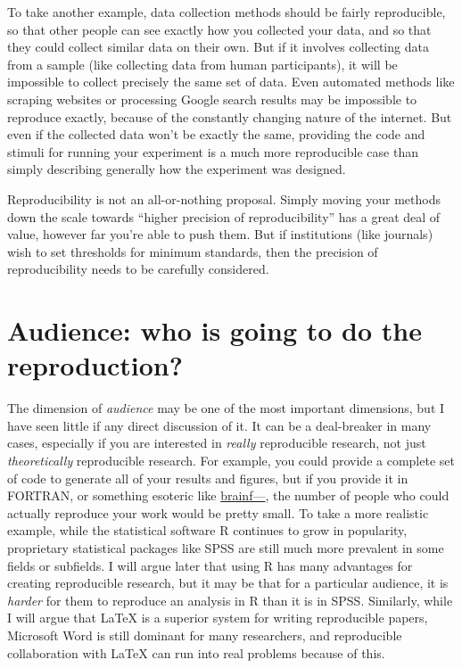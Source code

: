 \documentclass{book}
\begin{document}
To take another example, data collection methods should be fairly reproducible, so that other people can see exactly how you collected your data, and so that they could collect similar data on their own. But if it involves collecting data from a sample (like collecting data from human participants), it will be impossible to collect precisely the same set of data.  Even automated methods like scraping websites or processing Google search results may be impossible to reproduce exactly, because of the constantly changing nature of the internet.  But even if the collected data won't be exactly the same, providing the code and stimuli for running your experiment is a much more reproducible case than simply describing generally how the experiment was designed.

Reproducibility is not an all-or-nothing proposal. Simply moving your methods down the scale towards ``higher precision of reproducibility'' has a great deal of value, however far you're able to push them.  But if institutions (like journals) wish to set thresholds for minimum standards, then the precision of reproducibility needs to be carefully considered.
\section{Audience: who is going to do the reproduction?}
\label{sec-3-3}

The dimension of \emph{audience} may be one of the most important dimensions, but I have seen little if any direct discussion of it. It can be a deal-breaker in many cases, especially if you are interested in \emph{really} reproducible research, not just \emph{theoretically} reproducible research. For example, you could provide a complete set of code to generate all of your results and figures, but if you provide it in FORTRAN, or something esoteric like \href{http://en.wikipedia.org/wiki/Brainfuck}{brainf---}, the number of people who could actually reproduce your work would be pretty small.  To take a more realistic example, while the statistical software R continues to grow in popularity, proprietary statistical packages like SPSS are still much more prevalent in some fields or subfields. I will argue later that using R has many advantages for creating reproducible research, but it may be that for a particular audience, it is \emph{harder} for them to reproduce an analysis in R than it is in SPSS.  Similarly, while I will argue that \LaTeX{} is a superior system for writing reproducible papers, Microsoft Word is still dominant for many researchers, and reproducible collaboration with \LaTeX{} can run into real problems because of this.
\end{document}
